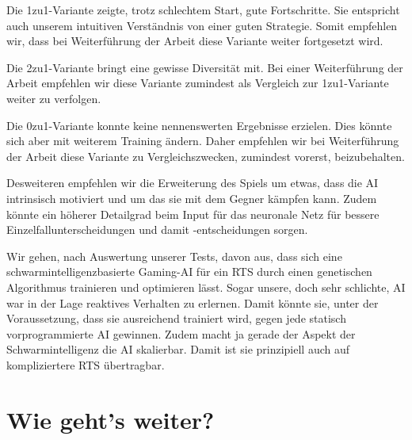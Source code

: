 \documentclass[
	12pt,
	a4paper,
	BCOR10mm,
	DIV14,
	headsepline,
	usegeometry,
]{scrreprt}
\begin{document}
Die 1zu1-Variante zeigte, trotz schlechtem Start, gute Fortschritte.
Sie entspricht auch unserem intuitiven Verständnis von einer guten Strategie.
Somit empfehlen wir, dass bei Weiterführung der Arbeit diese Variante weiter fortgesetzt wird.

Die 2zu1-Variante bringt eine gewisse Diversität mit.
Bei einer Weiterführung der Arbeit empfehlen wir diese Variante zumindest als Vergleich zur 1zu1-Variante weiter zu verfolgen.

Die 0zu1-Variante konnte keine nennenswerten Ergebnisse erzielen.
Dies könnte sich aber mit weiterem Training ändern.
Daher empfehlen wir bei Weiterführung der Arbeit diese Variante zu Vergleichszwecken, zumindest vorerst, beizubehalten.

Desweiteren empfehlen wir die Erweiterung des Spiels um etwas, dass die AI intrinsisch motiviert und um das sie mit dem Gegner kämpfen kann.
Zudem könnte ein höherer Detailgrad beim Input für das neuronale Netz für bessere Einzelfallunterscheidungen und damit -entscheidungen sorgen.

Wir gehen, nach Auswertung unserer Tests, davon aus, dass sich eine schwarmintelligenzbasierte Gaming-AI für ein RTS durch einen genetischen Algorithmus trainieren und optimieren lässt.
Sogar unsere, doch sehr schlichte, AI war in der Lage reaktives Verhalten zu erlernen.
Damit könnte sie, unter der Voraussetzung, dass sie ausreichend trainiert wird, gegen jede statisch vorprogrammierte AI gewinnen.
Zudem macht ja gerade der Aspekt der Schwarmintelligenz die AI skalierbar.
Damit ist sie prinzipiell auch auf kompliziertere RTS übertragbar.



\chapter{Wie geht's weiter?}
\end{document}
